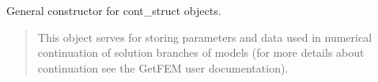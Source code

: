 \documentclass[a4paper,11pt,english]{sphinxmanual}
\begin{document}
\begin{sphinxVerbatim}[commandchars=\\\{\}]
     \PYG{p}{[}     \PYG{p}{]}  \PYG{p}{[} \PYG{p}{]}
\end{sphinxVerbatim}

\sphinxAtStartPar
{}

\sphinxAtStartPar
General constructor for cont\_struct objects.
\begin{quote}

\sphinxAtStartPar
This object serves for storing parameters and data used in numerical
continuation of solution branches of models (for more details about
continuation see the GetFEM user documentation).
\end{quote}
\end{document}
